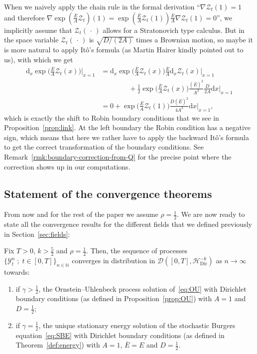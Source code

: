 \documentclass[AHL,Unicode,longabstracts]{cedram}
\newcommand{\bb}[1]{{\mathbb #1}}
\newcommand{\mc}[1]{{\mathcal #1}}
\renewcommand{\mc}[1]{{\mathcal #1}}
\renewcommand{\bar}{\overline}
\newcommand*{\dd}{\mathrm{d}}
\newcommand*{\dx}{\dd x}
\renewcommand{\tfrac}{\frac}
\begin{document}
\begin{rema}\label{rmk:ito-boundary}
When we naively apply the chain rule in the formal derivation ``$\nabla \mc Z_t (1) = 1$ and therefore $\nabla \exp(\tfrac{\bar{E}}{A} \mc Z_t)(1) = \exp(\tfrac{\bar{E}}{A} \mc Z_t(1)) \tfrac{\bar{E}}{A} \nabla \mc Z_t(1) = 0$'', we implicitly assume that $\mc Z_t({\,\cdot\,})$ allows for a Stratonovich type calculus. But in the space variable $\mc Z_t({\,\cdot\,})$ is $\sqrt{D/(2A)}$ times a Brownian motion, so maybe it is more natural to apply It\^o's formula (as Martin Hairer kindly pointed out to us), with which we get
\begin{align*}
\dd_x \exp\bigg(\tfrac{\bar{E}}{A} \mc Z_t(x)\bigg)\bigg|_{x=1} & = \dd_x \exp\bigg(\tfrac{\bar{E}}{A} \mc Z_t(x)\bigg)\frac{\bar{E}}{A} \dd_x \mc Z_t(x)\bigg|_{x=1} \\
&\qquad\qquad + \tfrac{1}{2} \exp\bigg(\tfrac{\bar{E}}{A} \mc Z_t(x)\bigg)\frac{(\bar{E})^2}{A^2} \frac{D}{2A} \dx\bigg|_{x=1}\\
& = 0 + \exp\bigg(\tfrac{\bar{E}}{A} \mc Z_t(1)\bigg)\frac{D(\bar{E})^2}{4A^3}\dx\bigg|_{x=1},
\end{align*}
which is exactly the shift to Robin boundary conditions that we see in Proposition~\ref{prop:link}. At the left boundary the Robin condition has a negative sign, which means that here we rather have to apply the backward It\^o's formula to get the correct transformation of the boundary conditions. See Remark~\ref{rmk:boundary-correction-from-Q} for the precise point where the correction shows up in our computations.
\end{rema}

\subsection{Statement of the convergence theorems} \label{ssec:results}
From now and for the rest of the paper we assume $\rho=\frac12$. We are now ready to state all the convergence results for the different fields that we defined previously in Section~\ref{sec:fields}:

\begin{theo}\label{theo:convergence}
Fix $T>0$, $k>\frac52$ and $\rho=\frac12$. Then, the sequence of processes $\{\mathcal{Y}_t^n \; ; \; t\in[0,T]\}_{n\in\bb N}$ converges in distribution in $\mc D([0,T],\mc H_{\mathrm{Dir}}^{-k})$ as $n\to \infty$ towards:
\begin{enumerate}
\item \label{3.17.1} if $\gamma>\frac12$, the Ornstein--Uhlenbeck process solution of~\eqref{eq:OU} with Dirichlet boundary conditions (as defined in Proposition~\ref{prop:OU}) with $A=1$ and $D=\frac12$;
\item \label{3.17.2} if $\gamma=\frac12$, the unique stationary energy solution of the stochastic Burgers equation~\eqref{eq:SBE} with Dirichlet boundary conditions (as defined in Theorem~\ref{def:energy}) with $A=1$, $\bar E=E$ and $D=\frac12$.
\end{enumerate}
\end{theo}
\end{document}
